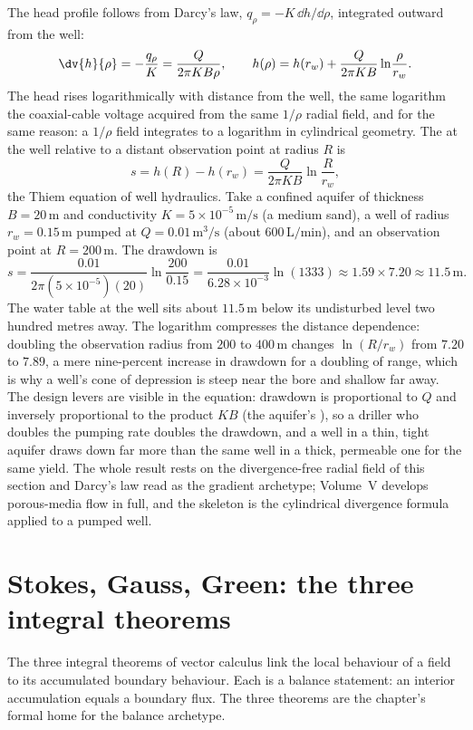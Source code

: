 The head profile follows from Darcy's law, $q_{\rho} = -K\,\dd h/\dd
\rho$, integrated outward from the well:
\[
\dv{h}{\rho} = -\frac{q_{\rho}}{K} = \frac{Q}{2\pi K B\rho},
\qquad
h(\rho) = h(r_{w}) + \frac{Q}{2\pi K B}\ln\!\frac{\rho}{r_{w}}.
\]
The head rises logarithmically with distance from the well, the same
logarithm the coaxial-cable voltage acquired from the same $1/\rho$
radial field, and for the same reason: a $1/\rho$ field integrates to a
logarithm in cylindrical geometry. The  at the well
relative to a distant observation point at radius $R$ is
\[
s = h(R) - h(r_{w}) = \frac{Q}{2\pi K B}\ln\!\frac{R}{r_{w}},
\]
the Thiem equation of well hydraulics. Take a confined aquifer of
thickness $B = 20\,\si{\meter}$ and conductivity $K = 5\times 10^{-5}
\,\si{\meter\per\second}$ (a medium sand), a well of radius $r_{w} =
0.15\,\si{\meter}$ pumped at $Q = 0.01\,\si{\meter\cubed\per\second}$
(about $600\,\si{\liter\per\minute}$), and an observation point at
$R = 200\,\si{\meter}$. The drawdown is
\[
s = \frac{0.01}{2\pi(5\times 10^{-5})(20)}\ln\!\frac{200}{0.15} =
\frac{0.01}{6.28\times 10^{-3}}\ln(1333) \approx 1.59\times 7.20
\approx 11.5\,\si{\meter}.
\]
The water table at the well sits about $11.5\,\si{\meter}$ below its
undisturbed level two hundred metres away. The logarithm compresses the
distance dependence: doubling the observation radius from $200$ to
$400\,\si{\meter}$ changes $\ln(R/r_{w})$ from $7.20$ to $7.89$, a
mere nine-percent increase in drawdown for a doubling of range, which
is why a well's cone of depression is steep near the bore and shallow
far away. The design levers are visible in the equation: drawdown is
proportional to $Q$ and inversely proportional to the product $KB$
(the aquifer's ), so a driller who doubles the
pumping rate doubles the drawdown, and a well in a thin, tight aquifer
draws down far more than the same well in a thick, permeable one for
the same yield. The whole result rests on the divergence-free radial
field of this section and Darcy's law read as the gradient archetype;
Volume~V develops porous-media flow in full, and the skeleton is the
cylindrical divergence formula applied to a pumped well.

\section{Stokes, Gauss, Green: the three integral theorems}

The three integral theorems of vector calculus link the local
behaviour of a field to its accumulated boundary behaviour. Each is
a balance statement: an interior accumulation equals a boundary flux.
The three theorems are the chapter's formal home for the balance
archetype.

